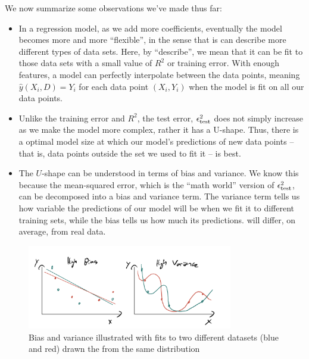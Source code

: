  We now summarize some observations we've made thus far:
\begin{itemize}
\item In a regression model, as we add more coefficients, eventually the model becomes more and more ``flexible'', in the sense that is can describe more different types of data sets. Here, by ``describe'', we mean that it can be fit to those data sets with a small value of $R^2$ or training error.  With enough features, a model can perfectly interpolate between the data points, meaning $\hat{y}(X_i,D) = Y_i$ for each data point $(X_i,Y_i)$ when the model is fit on all our data points. 
\item Unlike the training error and $R^2$, the test error, $\epsilon_{\rm test}^2$ does not simply increase as we make the model more complex, rather it has a U-shape. Thus, there is a optimal model size at which our model's predictions of new data points -- that is, data points outside the set we used to fit it -- is best. 
\item The $U$-shape can be understood in terms of bias and variance. We know this because the mean-squared error, which is the ``math world'' version of $\epsilon_{\rm test}^2$, can be decomposed into a bias and variance term. The variance term tells us how variable the predictions of our model will be when we fit it to different training sets, while the bias tells us how much its predictions. will differ, on average, from real data. 
\end{itemize}

\begin{figure}[h]
    \centering
    \includegraphics[width=0.8\textwidth]{./../figures/bias_var}
    \caption{Bias and variance illustrated with fits to two different datasets (blue and red) drawn the from the same distribution}
    \label{fig:bv}
\end{figure}







